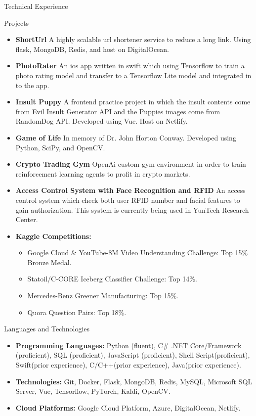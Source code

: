 \documentclass[]{mcdowellcv}
\begin{document}
	\begin{cvsection}{Technical Experience}
		\begin{cvsubsection}{Projects}{}{}
			\begin{itemize}
				\item \textbf{ShortUrl}  A highly scalable url shortener service to reduce a long link. Using flask, MongoDB, Redis, and host on DigitalOcean.
				\item \textbf{PhotoRater}  An ios app written in swift which using Tensorflow to train a photo rating model and transfer to a Tensorflow Lite model and integrated in to the app.
				\item \textbf{Insult Puppy}  A frontend practice project in which the insult contents come from Evil Insult Generator API and the Puppies images come from RandomDog API. Developed using Vue. Host on Netlify.
				\item \textbf{Game of Life}  In memory of Dr. John Horton Conway. Developed using Python, SciPy, and OpenCV.
				\item \textbf{Crypto Trading Gym}  OpenAi custom gym environment in order to train reinforcement learning agents to profit in crypto markets.
				\item \textbf{Access Control System with Face Recognition and RFID}  An access control system which check both user RFID number and facial features to gain authorization. This system is currently being used in YunTech Research Center.
				\item \textbf{Kaggle Competitions:}
					\begin{itemize}
						\item Google Cloud \& YouTube-8M Video Understanding Challenge: Top 15\% Bronze Medal.
						\item Statoil/C-CORE Iceberg Classifier Challenge: Top 14\%.
						\item Mercedes-Benz Greener Manufacturing: Top 15\%.
						\item Quora Question Pairs: Top 18\%.
					\end{itemize}
			\end{itemize}
		\end{cvsubsection}
	\end{cvsection}
	
	\begin{cvsection}{Languages and Technologies}
		\begin{cvsubsection}{}{}{}	
			\begin{itemize}
				\item \textbf{Programming Languages:}  Python (fluent), C\# .NET Core/Framework (proficient), SQL (proficient), JavaScript (proficient), Shell Script(proficient), Swift(prior experience), C/C++(prior experience), Java(prior experience).
				\item \textbf{Technologies:}  Git, Docker, Flask, MongoDB, Redis, MySQL, Microsoft SQL Server, Vue, Tensorflow, PyTorch, Kaldi, OpenCV.
				\item \textbf{Cloud Platforms:}  Google Cloud Platform, Azure, DigitalOcean, Netlify.
			\end{itemize}
		\end{cvsubsection}
	\end{cvsection}
	
\end{document}
